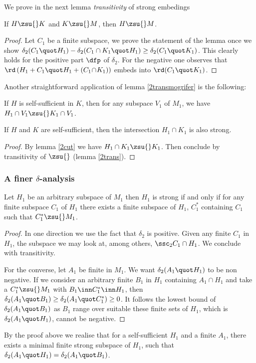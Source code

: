 \medskip
We prove in the next lemma {\em transitivity} of strong embedings
\begin{lem}\label{2trans}
If $H\zsu{} K$ and $K\zsu{} M$, then $H\zsu{}M$.
\end{lem}
\begin{proof}
Let $C_{1}$ be a finite subspace, we prove the statement of the lemma once we show $\delta_{2}(C_{1}\quot H_{1})-\delta_{2}(C_{1}\cap K_{1}\quot H_{1})\geq\delta_{2}(C_{1}\quot K_{1})$. This clearly holds for the positive part $\dfp$ of $\delta_{2}$.
For the negative one observes that $\rd\left(H_{1}+C_{1}\quot
H_{1}+(C_{1}\!\cap\!K_{1})\right)$ embeds into $\rd(C_{1}\quot K_{1})$.
\end{proof}


Another straightforward application of lemma \ref{2transmogrifer} is the following:
\begin{lem}\label{2cut}
If $H$ is self-sufficient in $K$, then for any subspace $V_{1}$ of $M_{1}$, we have
$H_{1}\cap V_{1}\zsu{} K_{1}\cap V_{1}$.
\end{lem}
\begin{cor}\label{interstrong}
If $H$ and $K$ are self-sufficient,
then the intersection $H_{1}\cap K_{1}$ is also strong.
\end{cor}
\begin{proof}
By lemma \ref{2cut} we have $H_{1}\cap K_{1}\zsu{} K_{1}$.
Then conclude by transitivity of $\zsu{}$ (lemma \ref{2trans}).
\end{proof}


\subsubsection*{A finer $\delta$-analysis}
\begin{prop}\label{2strnchar}
Let $H_{1}$  be an arbitrary subspace of $M_{1}$ then
$H_{1}$ is strong if and only if for any finite subspace
$C_{1}$ of $H_{1}$ there exists a finite
subspace of $H_{1}$, $C_{1}^{*}$ containing $C_{1}$ such that
$C_{1}^{*}\zsu{} M_{1}$.
\end{prop}
\begin{proof}
In one direction we use the fact that $\delta_{2}$ is positive.
Given any finite $C_{1}$ in $H_{1}$, the subspace we
may look at, among others, $\ssc_{2}C_{1}\cap H_{1}$. We conclude
with transitivity.

\smallskip
For the converse, let $A_{1}$ be finite in $M_{1}$.
We want $\delta_{2}(A_{1}\quot H_{1})$ to be non negative.
If we consider an arbitrary finite $B_{1}$ in $H_{1}$ containing
$A_{1}\cap H_{1}$ and take a $C_{1}^{*}\zsu{} M_{1}$
with $B_{1}\inn C_{1}^{*}\inn H_{1}$, then $\delta_{2}(
A_{1}\quot B_{1})\geq\delta_{2}(A_{1}\quot C_{1}^{*})\geq0$.
It follows the lowest bound of $\delta_{2}(A_{1}\quot B_{1})$ as $B_{1}$ range over
suitable these finite sets of $H_{1}$, which is $\delta_{2}(A_{1}\quot H_{1})$,
cannot be negative.
\end{proof}
By the proof above we realise that for a self-sufficient $H_{1}$ and a finite $A_{1}$, there exists
a minimal finite strong subspace of $H_{1}$, such that $\delta_{2}(A_{1}\quot H_{1})=\delta_{2}(A_{1}\quot B_{1})$.

